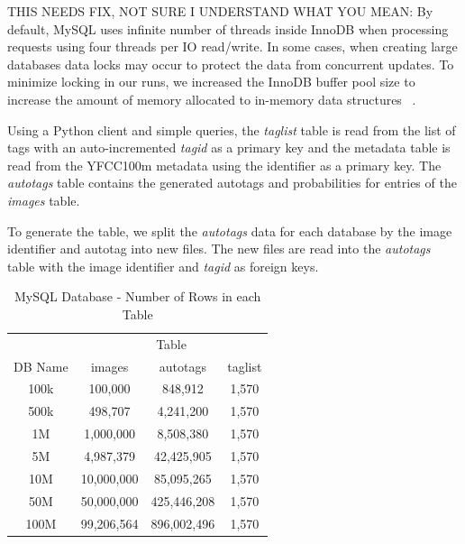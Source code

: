 THIS NEEDS FIX, NOT SURE I UNDERSTAND WHAT YOU MEAN:
By default, MySQL uses infinite number of threads inside InnoDB when processing
requests using four threads per IO read/write.
In some cases, when creating large databases data locks may occur to protect the
data from concurrent updates.
To minimize locking in our runs, we increased the InnoDB buffer pool size to
increase the amount of memory allocated to in-memory data structures
~\cite{mysql,mysql_blog}.

Using a Python client and simple queries, the \textit{taglist}
table is read from the list of tags with an auto-incremented
\textit{tagid} as a primary key and the metadata table
is read from the YFCC100m metadata using the identifier as a primary key.
The \textit{autotags} table contains the generated autotags and
probabilities for entries of the \textit{images} table.

To generate the table, we split the \textit{autotags} data for each database
by the image identifier and autotag into new files.
The new files are read into the \textit{autotags} table with the image
identifier and \textit{tagid} as foreign keys.

\begin{table}[h]
\caption{MySQL Database - Number of Rows in each Table}
\centering
\begin{tabular}{c c c c}
\hline\hline
 & \multicolumn{3}{c}{Table}\\
\cline{2-4}
DB Name & images & autotags & taglist\\
\hline
100k & 100,000    & 848,912     & 1,570\\
500k & 498,707    & 4,241,200   & 1,570\\
1M   & 1,000,000  & 8,508,380   & 1,570\\
5M   & 4,987,379  & 42,425,905  & 1,570\\
10M  & 10,000,000 & 85,095,265  & 1,570\\
50M  & 50,000,000 & 425,446,208 & 1,570\\
100M & 99,206,564 & 896,002,496 & 1,570\\
\hline
\end{tabular}
\label{table:mysqltables}
\end{table}

